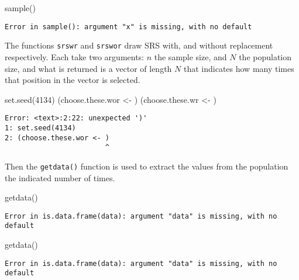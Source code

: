 \documentclass[
  letterpaper,
  DIV=11,
  numbers=noendperiod]{scrartcl}
\newenvironment{Shaded}{}{}
\newcommand{\DecValTok}[1]{\textcolor[rgb]{0.00,0.36,0.77}{#1}}
\newcommand{\FunctionTok}[1]{\textcolor[rgb]{0.44,0.26,0.76}{#1}}
\newcommand{\NormalTok}[1]{\textcolor[rgb]{0.14,0.16,0.18}{#1}}
\newcommand{\OtherTok}[1]{\textcolor[rgb]{0.44,0.26,0.76}{#1}}
\begin{document}
\begin{Shaded}
\begin{Highlighting}[]
\FunctionTok{sample}\NormalTok{()}
\end{Highlighting}
\end{Shaded}

\begin{verbatim}
Error in sample(): argument "x" is missing, with no default
\end{verbatim}

The functions \texttt{srswr} and \texttt{srswor} draw SRS with, and
without replacement respectively. Each take two arguments: \(n\) the
sample size, and \(N\) the population size, and what is returned is a
vector of length \(N\) that indicates how many times that position in
the vector is selected.

\begin{Shaded}
\begin{Highlighting}[]
\FunctionTok{set.seed}\NormalTok{(}\DecValTok{4134}\NormalTok{)}
\NormalTok{(choose.these.wor }\OtherTok{\textless{}{-}}\NormalTok{ ) }
\NormalTok{(choose.these.wr }\OtherTok{\textless{}{-}}\NormalTok{ ) }
\end{Highlighting}
\end{Shaded}

\begin{verbatim}
Error: <text>:2:22: unexpected ')'
1: set.seed(4134)
2: (choose.these.wor <- )
                        ^
\end{verbatim}

Then the \texttt{getdata()} function is used to extract the values from
the population the indicated number of times.

\begin{Shaded}
\begin{Highlighting}[]
\FunctionTok{getdata}\NormalTok{()}
\end{Highlighting}
\end{Shaded}

\begin{verbatim}
Error in is.data.frame(data): argument "data" is missing, with no default
\end{verbatim}

\begin{Shaded}
\begin{Highlighting}[]
\FunctionTok{getdata}\NormalTok{()}
\end{Highlighting}
\end{Shaded}

\begin{verbatim}
Error in is.data.frame(data): argument "data" is missing, with no default
\end{verbatim}
\end{document}

